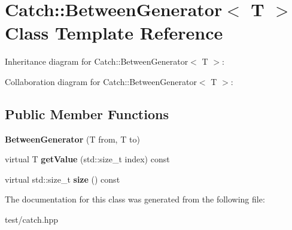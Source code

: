\hypertarget{classCatch_1_1BetweenGenerator}{}\section{Catch\+:\+:Between\+Generator$<$ T $>$ Class Template Reference}
\label{classCatch_1_1BetweenGenerator}


Inheritance diagram for Catch\+:\+:Between\+Generator$<$ T $>$\+:


Collaboration diagram for Catch\+:\+:Between\+Generator$<$ T $>$\+:
\subsection*{Public Member Functions}
\begin{DoxyCompactItemize}
\item 
{\bfseries Between\+Generator} (T from, T to)\hypertarget{classCatch_1_1BetweenGenerator_a835a057d691ae37caef660624099b51c}{}\label{classCatch_1_1BetweenGenerator_a835a057d691ae37caef660624099b51c}

\item 
virtual T {\bfseries get\+Value} (std\+::size\+\_\+t index) const \hypertarget{classCatch_1_1BetweenGenerator_af83575d62cc727ca995446cff4d6c26c}{}\label{classCatch_1_1BetweenGenerator_af83575d62cc727ca995446cff4d6c26c}

\item 
virtual std\+::size\+\_\+t {\bfseries size} () const \hypertarget{classCatch_1_1BetweenGenerator_aa53a04a259e796ba2b5adabed79474b5}{}\label{classCatch_1_1BetweenGenerator_aa53a04a259e796ba2b5adabed79474b5}

\end{DoxyCompactItemize}


The documentation for this class was generated from the following file\+:\begin{DoxyCompactItemize}
\item 
test/catch.\+hpp\end{DoxyCompactItemize}
